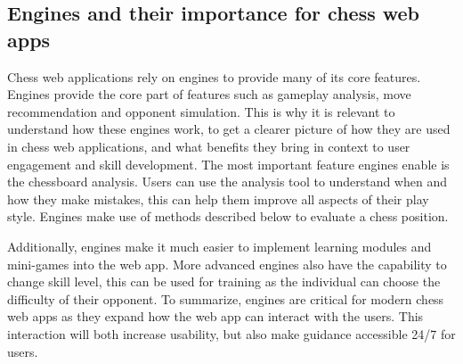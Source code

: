 \subsection{Engines and their importance for chess web apps}\label{subsec:webapps-engines}

Chess web applications rely on engines to provide many of its core features.
Engines provide the core part of features such as gameplay analysis,
move recommendation and opponent simulation.
This is why it is relevant to understand how these engines work,
to get a clearer picture of how they are used in chess web applications,
and what benefits they bring in context to user engagement and skill
development.
The most important feature engines enable is the chessboard analysis.
Users can use the analysis tool to understand when and how they make mistakes,
this can help them improve all aspects of their play style.
Engines make use of methods described below to evaluate a chess position.

Additionally, engines make it much easier to implement learning modules
and mini-games into the web app.
More advanced engines also have the capability to change skill level,
this can be used for training as the individual can choose the difficulty of
their opponent.
To summarize, engines are critical for modern chess web apps as they
expand how the web app can interact with the users.
This interaction will both increase usability, but also make guidance accessible
24/7 for users.
